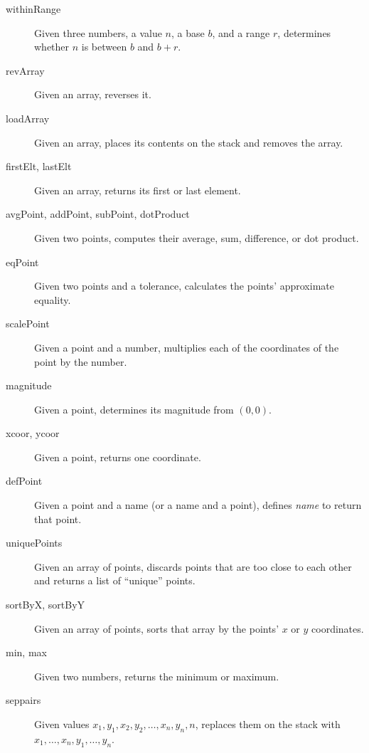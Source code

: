 \documentclass[12pt]{article}
\begin{document}
\begin{description}
\item[withinRange] Given three numbers, a value $n$, a base $b$, and a range
$r$, determines whether $n$ is between $b$ and $b+r$.

\item[revArray] Given an array, reverses it.

\item[loadArray] Given an array, places its contents on the stack and removes
the array.

\item[firstElt, lastElt] Given an array, returns its first or last element.

\item[avgPoint, addPoint, subPoint, dotProduct] Given two points, computes their
average, sum, difference, or dot product.

\item[eqPoint] Given two points and a tolerance, calculates the points'
approximate equality.

\item[scalePoint] Given a point and a number, multiplies each of the coordinates
of the point by the number.

\item[magnitude] Given a point, determines its magnitude from $(0,0)$.

\item[xcoor, ycoor] Given a point, returns one coordinate.

\item[defPoint] Given a point and a name (or a name and a point), defines
\emph{name} to return that point.

\item[uniquePoints] Given an array of points, discards points that are too close
to each other and returns a list of ``unique'' points.

\item[sortByX, sortByY] Given an array of points, sorts that array by the
points' $x$ or $y$ coordinates.

\item[min, max] Given two numbers, returns the minimum or maximum.

\item[seppairs] Given values $x_1, y_1, x_2, y_2,\ldots,x_n,y_n,n$, replaces
them on the stack with $x_1,\ldots,x_n,y_1,\ldots,y_n$.

\end{description}
\end{document}
